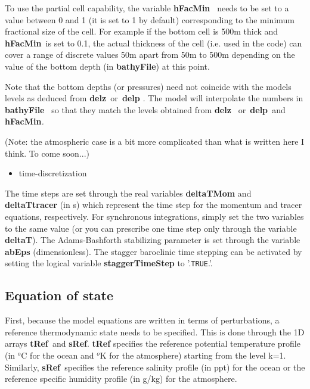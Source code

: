 To use the partial cell capability, the variable \textbf{hFacMin}\textit{\ }%
needs to be set to a value between 0 and 1 (it is set to 1 by default)
corresponding to the minimum fractional size of the cell. For example if the
bottom cell is 500m thick and \textbf{hFacMin}\textit{\ }is set to 0.1, the
actual thickness of the cell (i.e. used in the code) can cover a range of
discrete values 50m apart from 50m to 500m depending on the value of the
bottom depth (in \textbf{bathyFile}) at this point.

Note that the bottom depths (or pressures) need not coincide with the models
levels as deduced from \textbf{delz}\textit{\ }or\textit{\ }\textbf{delp}%
\textit{. }The model will interpolate the numbers in \textbf{bathyFile}%
\textit{\ }so that they match the levels obtained from \textbf{delz}\textit{%
\ }or\textit{\ }\textbf{delp}\textit{\ }and \textbf{hFacMin}\textit{. }

(Note: the atmospheric case is a bit more complicated than what is written
here I think. To come soon...)

\begin{itemize}
\item time-discretization
\end{itemize}

The time steps are set through the real variables \textbf{deltaTMom }and 
\textbf{deltaTtracer }(in s) which represent the time step for the momentum
and tracer equations, respectively. For synchronous integrations, simply set
the two variables to the same value (or you can prescribe one time step only
through the variable \textbf{deltaT}). The Adams-Bashforth stabilizing
parameter is set through the variable \textbf{abEps }(dimensionless). The
stagger baroclinic time stepping can be activated by setting the logical
variable \textbf{staggerTimeStep }to '.\texttt{TRUE}.'.

\subsection{Equation of state}

First, because the model equations are written in terms of perturbations, a
reference thermodynamic state needs to be specified. This is done through
the 1D arrays \textbf{tRef}\textit{\ }and \textbf{sRef}. \textbf{tRef }%
specifies the reference potential temperature profile (in $^{o}$C for
the ocean and $^{o}$K for the atmosphere) starting from the level
k=1. Similarly, \textbf{sRef}\textit{\ }specifies the reference salinity
profile (in ppt) for the ocean or the reference specific humidity profile
(in g/kg) for the atmosphere.

